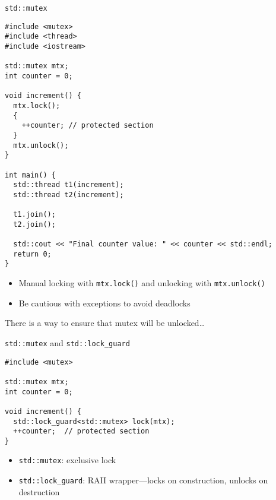 \documentclass{beamer}
\begin{document}
\begin{frame}[fragile]{\texttt{std::mutex}}
  \lstset{style=CStyle}
  \begin{lstlisting}
#include <mutex>
#include <thread>
#include <iostream>

std::mutex mtx;
int counter = 0;

void increment() {
  mtx.lock();
  {
    ++counter; // protected section
  }
  mtx.unlock();
}

int main() {
  std::thread t1(increment);
  std::thread t2(increment);

  t1.join();
  t2.join();

  std::cout << "Final counter value: " << counter << std::endl;
  return 0;
}
  \end{lstlisting}
  \begin{itemize}
    \item Manual locking with \texttt{mtx.lock()} and unlocking with \texttt{mtx.unlock()}
    \item Be cautious with exceptions to avoid deadlocks
  \end{itemize}
  There is a way to ensure that mutex will be unlocked\dots
\end{frame}

\begin{frame}[fragile]{\texttt{std::mutex} and \texttt{std::lock\_guard}}
  \lstset{style=CStyle}
  \begin{lstlisting}
#include <mutex>

std::mutex mtx;
int counter = 0;

void increment() {
  std::lock_guard<std::mutex> lock(mtx);
  ++counter;  // protected section
}
  \end{lstlisting}
  \begin{itemize}
    \item \texttt{std::mutex}: exclusive lock
    \item \texttt{std::lock\_guard}: RAII wrapper—locks on construction, unlocks on destruction
  \end{itemize}
\end{frame}
\end{document}
